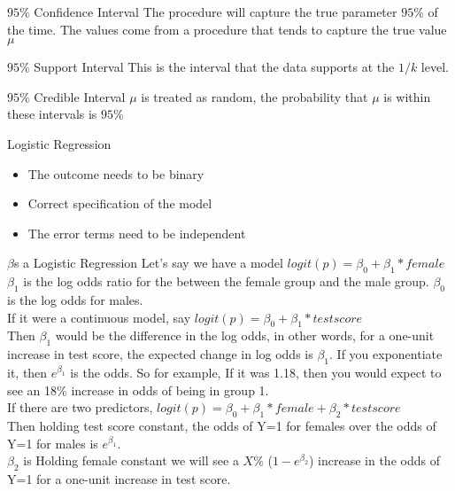 \documentclass[avery5388,grid,frame]{flashcards}
\begin{document}
\begin{flashcard}[Definition]{$95\%$ Confidence Interval}
\bigskip\bigskip
The procedure will capture the true parameter $95\%$ of the time. The values come from a procedure that tends to capture the true value $\mu$
\end{flashcard}
\begin{flashcard}[Definition]{$95\%$ Support Interval}
\bigskip\bigskip
This is the interval that the data supports at the $1/k$ level.
\end{flashcard}
\begin{flashcard}[Definition]{$95\%$ Credible Interval}
\bigskip\bigskip
$\mu$ is treated as random, the probability that $\mu$ is within these intervals is $95\%$
\end{flashcard}
\begin{flashcard}[Assumptions]{Logistic Regression}
\bigskip
\begin{itemize}
\item The outcome needs to be binary
\item Correct specification of the model
\item The error terms need to be independent
\end{itemize}
\end{flashcard}
\begin{flashcard}[Interpretation]{$\beta$s a Logistic Regression}
Let's say we have a model $logit(p)=\beta_0+\beta_1*female$\\
$\beta_1$ is the log odds ratio for the between the female group and the male group. $\beta_0$ is the log odds for males.\\
If it were a continuous model, say  $logit(p)=\beta_0+\beta_1*test score$\\
Then $\beta_1$ would be the difference in the log odds, in other words, for a one-unit increase in test score, the expected change in log odds is $\beta_1$. If you exponentiate it, then $e^{\beta_1}$  is the odds. So for example, If it was 1.18, then you would expect to see an 18$\%$ increase in odds of being in group 1. \\
If there are two predictors, $logit(p)=\beta_0+\beta_1*female+\beta_2*test score$\\
Then holding test score constant, the odds of Y=1 for females over the odds of Y=1 for males is $e^{\beta_1}$. \\
$\beta_2$ is Holding female constant we will see a $X\%$ ($1-e^{\beta_2}$) increase in the odds of Y=1 for a one-unit increase in test score. 
\end{flashcard}
\end{document}
